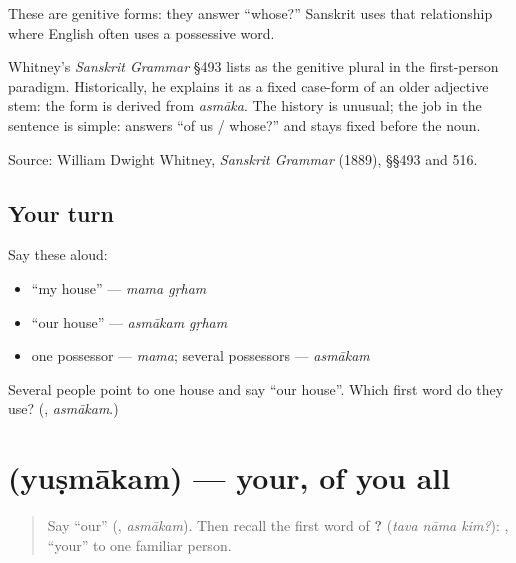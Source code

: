 These are genitive forms: they answer “whose?” Sanskrit uses that relationship where English often uses a possessive word.

\begin{cousinweb}
Whitney's \emph{Sanskrit Grammar} §493 lists \textbf{} as the genitive plural in the first-person paradigm. Historically, he explains it as a fixed case-form of an older adjective stem: the form is derived from \emph{asmāka}. The history is unusual; the job in the sentence is simple: \textbf{} answers “of us / whose?” and stays fixed before the noun.

Source: William Dwight Whitney, \emph{Sanskrit Grammar} (1889), §§493 and 516.
\end{cousinweb}

\subsection*{Your turn}
Say these aloud:

\begin{itemize}
\raggedright
  \item “my house” — \emph{mama gṛham}
  \item “our house” — \emph{asmākam gṛham}
  \item one possessor — \emph{mama}; several possessors — \emph{asmākam}
\end{itemize}

\begin{tcolorbox}[breakable,colback=teal!4,colframe=teal!35!black,title={Before you move on}]
Several people point to one house and say “our house”. Which first word do they use? (\textbf{}, \emph{asmākam}.)
\end{tcolorbox}
\section[\texorpdfstring{\sk{युष्माकम्} (yuṣmākam)}{युष्माकम् (yuṣmākam)}]{ (yuṣmākam) — your, of you all}

\label{lesson:SA-C259-yusmakam}



\begin{quote}
Say “our” (\textbf{}, \emph{asmākam}). Then recall the first word of \textbf{  ?} (\emph{tava nāma kim?}): \textbf{}, “your” to one familiar person.
\end{quote}

